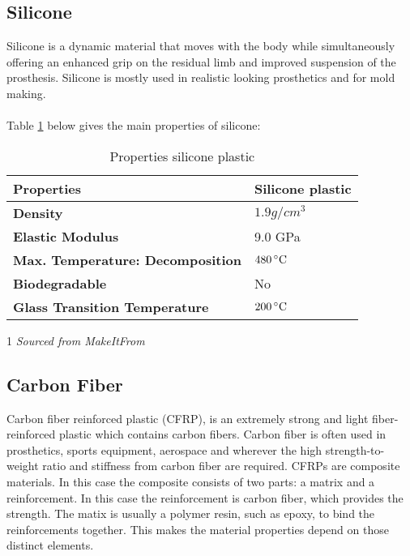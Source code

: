 \documentclass[a4paper]{article}
\begin{document}
\subsection{Silicone}
Silicone is a dynamic material that moves with the body while simultaneously offering 
an enhanced grip on the residual limb and improved suspension of the prosthesis.
Silicone is mostly used in realistic looking prosthetics and for mold making.
\\ \\ 
Table \ref{tab:silicone-properties} below gives the main properties of silicone:
\begin{table}[ht]
    \centering
    \begin{threeparttable}
        \begin{tabular}[t]{>{\bfseries}l l}
            \toprule
            Properties\tnote{1} & \textbf{Silicone plastic}  \\
            \midrule
            Density & $1.9 g/cm^3$  \\
            Elastic Modulus & 9.0 GPa \\ %
            Max. Temperature: Decomposition & $480\,^{\circ}{\rm C}$  \\
            Biodegradable & No  \\
            Glass Transition Temperature & $200\,^{\circ}{\rm C}$  \\ %
            \bottomrule
        \end{tabular}
        \caption{Properties silicone plastic}
        \label{tab:silicone-properties}
        \begin{tablenotes}
            \item[1] \textit{Sourced from MakeItFrom \cite{MakeItFrom}}
        \end{tablenotes}    
    \end{threeparttable}    
\end{table}

\subsection{Carbon Fiber}
Carbon fiber reinforced plastic (CFRP), is an extremely strong and light fiber-reinforced plastic which contains carbon fibers.
Carbon fiber is often used in prosthetics, sports equipment, aerospace and wherever the high strength-to-weight ratio and stiffness from carbon fiber are required.
CFRPs are composite materials.
In this case the composite consists of two parts: a matrix and a reinforcement.
In this case the reinforcement is carbon fiber, which provides the strength.
The matix is usually a polymer resin, such as epoxy, to bind the reinforcements together.
This makes the material properties depend on those distinct elements.
\end{document}
